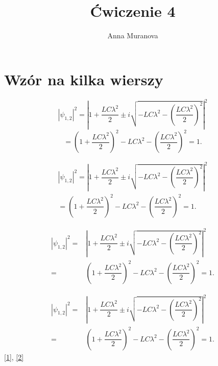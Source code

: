 \documentclass[a4paper, 12pt]{amsart}
\author[A. Muranova]{Anna Muranova}
\title{Ćwiczenie 4}
\theoremstyle{definition}
\begin{document}
\maketitle
\tableofcontents
\section{Wzór na kilka wierszy}
\begin{equation}
|\psi_{1,2}|^{2}=\left\vert 1+\dfrac{LC \lambda^2 }{2}\pm i\sqrt{-LC \lambda^2 -\left( \dfrac{
LC \lambda^2 }{2}\right) ^{2}}\right\vert ^{2}
\end{equation}
\begin{equation}
=\left( 1+\dfrac{LC \lambda^2 }{2}\right)
^{2}-LC \lambda^2 -\left( \dfrac{LC \lambda^2 }{2}\right) ^{2}=1.
\end{equation}

\begin{multline}
|\psi_{1,2}|^{2}=\left\vert 1+\dfrac{LC \lambda^2 }{2}\pm i\sqrt{-LC \lambda^2 -\left( \dfrac{
LC \lambda^2 }{2}\right) ^{2}}\right\vert ^{2}\\
=\left( 1+\dfrac{LC \lambda^2 }{2}\right)
^{2}-LC \lambda^2 -\left( \dfrac{LC \lambda^2 }{2}\right) ^{2}=1.
\end{multline} 



\begin{align}
|\psi_{1,2}|^{2}=&\left\vert 1+\dfrac{LC \lambda^2 }{2}\pm i\sqrt{-LC \lambda^2 -\left( \dfrac{
LC \lambda^2 }{2}\right) ^{2}}\right\vert ^{2}\label{1}\\
=&\left( 1+\dfrac{LC \lambda^2 }{2}\right)
^{2}-LC \lambda^2 -\left( \dfrac{LC \lambda^2 }{2}\right) ^{2}=1.\label{2}
\end{align}

\begin{equation}
\begin{split}
|\psi_{1,2}|^{2}=&\left\vert 1+\dfrac{LC \lambda^2 }{2}\pm i\sqrt{-LC \lambda^2 -\left( \dfrac{
LC \lambda^2 }{2}\right) ^{2}}\right\vert ^{2}\\
=&\left( 1+\dfrac{LC \lambda^2 }{2}\right)
^{2}-LC \lambda^2 -\left( \dfrac{LC \lambda^2 }{2}\right) ^{2}=1.
\end{split}
\end{equation}
\eqref{1}, \eqref{2}
\end{document}
